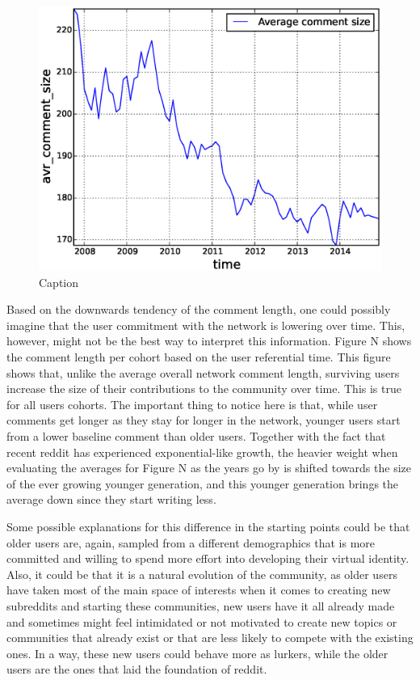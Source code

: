 \begin{figure}[!tb]
\centering
\includegraphics[scale=0.4]{./images/avr_comment_size_over_time_total.eps}
\caption{Caption}
\label{fig:avr_comment_size_over_time_total}
\end{figure}

Based on the downwards tendency of the comment length, one could possibly imagine that the user commitment with the network is lowering over time. This, however, might not be the best way to interpret this information. Figure N shows the comment length per cohort based on the user referential time. This figure shows that, unlike the average overall network comment length, surviving users increase the size of their contributions to the community over time. This is true for all users cohorts. The important thing to notice here is that, while user comments get longer as they stay for longer in the network, younger users start from a lower baseline comment than older users. Together with the fact that recent reddit has experienced exponential-like growth, the heavier weight when evaluating the averages for Figure N as the years go by is shifted towards the size of the ever growing younger generation, and this younger generation brings the average down since they start writing less.

Some possible explanations for this difference in the starting points could be that older users are, again, sampled from a different demographics that is more committed and willing to spend more effort into developing their virtual identity. Also, it could be that it is a natural evolution of the community, as older users have taken most of the main space of interests when it comes to creating new subreddits and starting these communities, new users have it all already made and sometimes might feel intimidated or not motivated to create new topics or communities that already exist or that are less likely to compete with the existing ones. In a way, these new users could behave more as lurkers, while the older users are the ones that laid the foundation of reddit.

